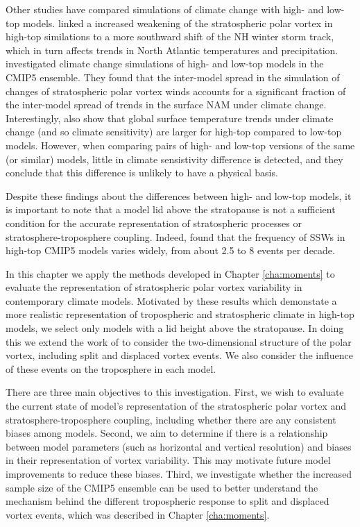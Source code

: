 Other studies have compared simulations of climate change with high- and low-top
models. \citet{Huebener2007} linked a increased weakening of the stratospheric
polar vortex in high-top similations to a more southward shift of the NH winter
storm track, which in turn affects trends in North Atlantic temperatures and
precipitation. \citet{Manzini2014} investigated climate change simulations of
high- and low-top models in the CMIP5 ensemble. They found that the inter-model
spread in the simulation of changes of stratospheric polar vortex winds accounts
for a significant fraction of the inter-model spread of trends in the surface
NAM under climate change. Interestingly, \citet{Manzini2014} also show that
global surface temperature trends under climate change (and so climate
sensitivity) are larger for high-top compared to low-top models. However, when
comparing pairs of high- and low-top versions of the same (or similar) models,
little in climate sensistivity difference is detected, and they conclude that
this difference is unlikely to have a physical basis.

Despite these findings about the differences between high- and low-top models,
it is important to note that a model lid above the stratopause is not a
sufficient condition for the accurate representation of stratospheric processes
or stratosphere-troposphere coupling. Indeed, \citet{Charlton-Perez2013} found
that the frequency of SSWs in high-top CMIP5 models varies widely, from about
2.5 to 8 events per decade. 

In this chapter we apply the methods developed in Chapter \ref{cha:moments} to
evaluate the representation of stratospheric polar vortex variability in
contemporary climate models. Motivated by these results which demonstate a more
realistic representation of tropospheric and stratospheric climate in high-top
models, we select only models with a lid height above the stratopause. In doing
this we extend the work of \citet{Charlton-Perez2013} to consider the
two-dimensional structure of the polar vortex, including split and displaced
vortex events. We also consider the influence of these events on the troposphere
in each model.

There are three main objectives to this investigation. First, we wish to
evaluate the current state of model's representation of the stratospheric polar
vortex and stratosphere-troposphere coupling, including whether there are any
consistent biases among models. Second, we aim to determine if there is a
relationship between model parameters (such as horizontal and vertical
resolution) and biases in their representation of vortex variability. This may
motivate future model improvements to reduce these biases. Third, we investigate
whether the increased sample size of the CMIP5 ensemble can be used to better
understand the mechanism behind the different tropospheric response to split and
displaced vortex events, which was described in Chapter \ref{cha:moments}. 

